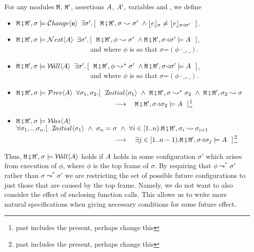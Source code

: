\begin{definition}  \label{def:valid:assertion:time}
For any modules $\M$, $\M'$, assertions $\A$, $\A'$, variables  and , we define
  
\begin{itemize}
 \item
 $\M\mkpair \M', \sigma \models   \Changes{\prg{e}}$  \IFF
 $\exists \sigma'.\, [\ \ \M\mkpair \M',\sigma \leadsto \sigma' \ \wedge \interp{e}{\sigma} \neq \interp{e}{\sigma\triangleleft \sigma'} \ \  ]$.
 \item
  $\M\mkpair \M', \sigma \models  \Next \A $
  \IFF
  $\exists \sigma'.\, [\ \ \M\mkpair \M',\phi \leadsto  \sigma' \ \wedge \M\mkpair \M',\sigma\adapt\sigma' \models \A \ \  ]$,
 \\
$\strut ~ \hspace{1.4in} $  and where $\phi$ is
so that $\sigma$=$(\phi\cdot\_,\_)$.\item
  $\M\mkpair \M', \sigma \models  \Future \A $
  \IFF
  $\exists \sigma'.\, [\ \ \M\mkpair \M',\phi \leadsto^* \sigma' \ \wedge \M\mkpair \M',\sigma\adapt\sigma' \models \A \ \  ]$,
 \\
$\strut ~ \hspace{1.4in} $  and where $\phi$ is
so that $\sigma$=$(\phi\cdot\_,\_)$.  
  \item
 $\M\mkpair \M', \sigma \models  \Prev \A $ \IFF
 $\forall \sigma_1, \sigma_2. [\ \ \Initial{\sigma_1}\ \wedge \   \M\mkpair \M', \sigma  \leadsto^*  \sigma_2 \ \wedge \   \M\mkpair \M', \sigma_2  \leadsto   \sigma  
$
 \\
$\strut ~ \hspace{1.9in} $  $ \longrightarrow \ \ \   
 \M\mkpair \M', \sigma\adapt\sigma_2  \models \A\ \
 ]$\footnote{past includes the present, perhaps change this}
 \item
 $\M\mkpair \M', \sigma \models  \Past \A $ \IFF
 $\forall \sigma_1, ... \sigma_n. [\ \ \Initial{\sigma_1}\ \wedge \  \sigma_n=\sigma 
  \ \wedge \ \forall i\in[1..n). \M\mkpair \M', \sigma_{i} \leadsto  \sigma_{i+1}
$
 \\
$\strut ~ \hspace{1.9in} $  $ \longrightarrow \ \ \  \exists j\in [1..n-1).
 \M\mkpair \M', \sigma\adapt\sigma_j  \models \A\ \
 ]$\footnote{past includes the present, perhaps change this}
\end{itemize}
\end{definition}

Thus,  $\M\mkpair \M', \sigma \models  \Future \A $ holds if
$\A$ holds in some configuration $\sigma'$ which arises from execution of $\phi$, where $\phi$ is the top frame of $\sigma$. By requiring that $\phi \leadsto^* \sigma' $ rather than
$\sigma \leadsto^* \sigma' $ we are restricting the set of possible future configurations to
just those that are caused by the top frame.
Namely, we do not want to also consider the effect of  enclosing function calls.
This allows us to write more natural specifications
when giving necessary conditions for some future effect.
 

